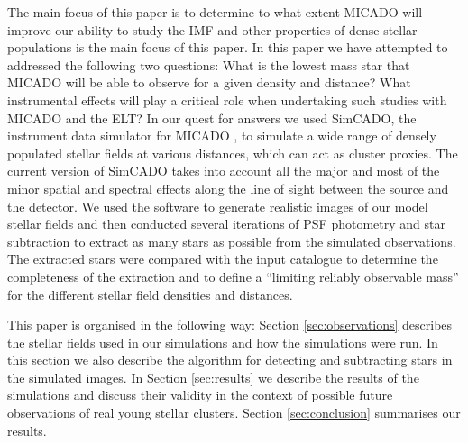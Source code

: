 The main focus of this paper is to determine to what extent MICADO will improve our ability to study the IMF and other properties of dense stellar populations is the main focus of this paper. In this paper we have attempted to addressed the following two questions: What is the lowest mass star that MICADO will be able to observe for a given density and distance? What instrumental effects will play a critical role when undertaking such studies with MICADO and the ELT?
In our quest for answers we used SimCADO, the instrument data simulator for MICADO \citep{leschinski2016}, to simulate a wide range of densely populated stellar fields at various distances, which can act as cluster proxies. The current version of SimCADO takes into account all the major and most of the minor spatial and spectral effects along the line of sight between the source and the detector. We used the software to generate realistic images of our model stellar fields and then conducted several iterations of PSF photometry and star subtraction to extract as many stars as possible from the simulated observations. The extracted stars were compared with the input catalogue to determine the completeness of the extraction and to define a ``limiting reliably observable mass'' for the different stellar field densities and distances.

This paper is organised in the following way: Section \ref{sec:observations} describes the stellar fields used in our simulations and how the simulations were run. In this section we also describe the algorithm for detecting and subtracting stars in the simulated images. In Section \ref{sec:results} we describe the results of the simulations and discuss their validity in the context of possible future observations of real young stellar clusters. Section \ref{sec:conclusion} summarises our results.



